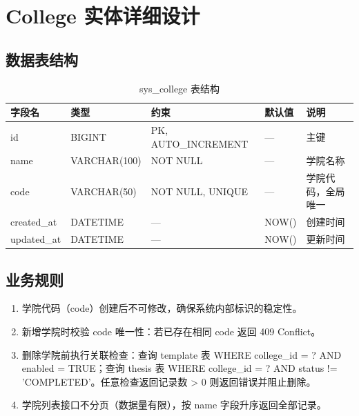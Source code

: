 
\section{College 实体详细设计}

\subsection{数据表结构}

\begin{table}[htbp]
\centering
\caption{sys\_college 表结构}
\begin{tabular}{lllll}
\toprule
\textbf{字段名} & \textbf{类型} & \textbf{约束} & \textbf{默认值} & \textbf{说明} \\
\midrule
id        & BIGINT  & PK, AUTO\_INCREMENT & —      & 主键 \\
name      & VARCHAR(100) & NOT NULL        & —      & 学院名称 \\
code      & VARCHAR(50)  & NOT NULL, UNIQUE & —      & 学院代码，全局唯一 \\
created\_at & DATETIME & —              & NOW()  & 创建时间 \\
updated\_at & DATETIME & —              & NOW()  & 更新时间 \\
\bottomrule
\end{tabular}
\end{table}

\subsection{业务规则}

\begin{enumerate}
    \item 学院代码（code）创建后不可修改，确保系统内部标识的稳定性。
    \item 新增学院时校验 code 唯一性：若已存在相同 code 返回 409 Conflict。
    \item 删除学院前执行关联检查：查询 template 表 WHERE college\_id = ? AND enabled = TRUE；查询 thesis 表 WHERE college\_id = ? AND status != 'COMPLETED'。任意检查返回记录数 > 0 则返回错误并阻止删除。
    \item 学院列表接口不分页（数据量有限），按 name 字段升序返回全部记录。
\end{enumerate}

